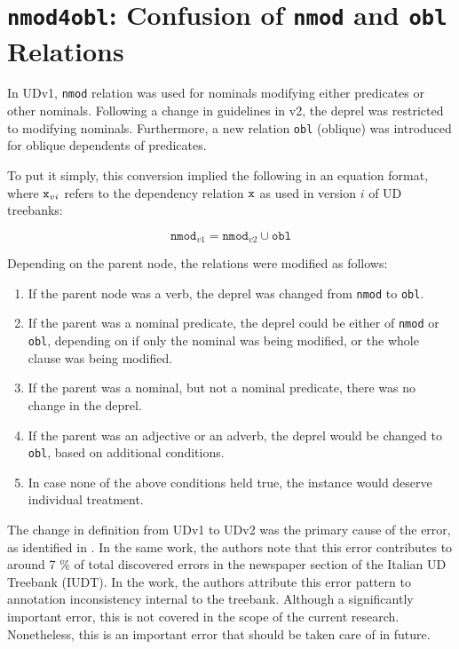 \section{\texttt{nmod4obl}: Confusion of \texttt{nmod} and \texttt{obl} Relations}
\label{sec:probnmod4obl}

In UDv1, \verb|nmod| relation was used for nominals modifying either predicates or other nominals. Following a change in guidelines in v2, the deprel was restricted to modifying nominals. Furthermore, a new relation \verb|obl| (oblique) was introduced for oblique dependents of predicates.

To put it simply, this conversion implied the following in an equation format, where \(\verb|x|_{vi}\) refers to the dependency relation \(\verb|x|\) as used in version \(i\) of UD treebanks:

\begin{equation*}
    \boxed{\texttt{nmod}_{v1} = \texttt{nmod}_{v2} \cup \texttt{obl}}
\end{equation*}

Depending on the parent node, the relations were modified as follows:

\begin{enumerate}
    \item If the parent node was a verb, the deprel was changed from \texttt{nmod} to \texttt{obl}.
    \item If the parent was a nominal predicate, the deprel could be either of \texttt{nmod} or \texttt{obl}, depending on if only the nominal was being modified, or the whole clause was being modified.
    \item If the parent was a nominal, but not a nominal predicate, there was no change in the deprel.
    \item If the parent was an adjective or an adverb, the deprel would be changed to \texttt{obl}, based on additional conditions.
    \item In case none of the above conditions held true, the instance would deserve individual treatment.
\end{enumerate}

The change in definition from UDv1 to UDv2 was the primary cause of the error, as identified in \cite{alzetta2017dangerous}. In the same work, the authors note that this error contributes to around 7 \% of total discovered errors in the newspaper section of the Italian UD Treebank (IUDT). In the work, the authors attribute this error pattern to annotation inconsistency internal to the treebank. Although a significantly important error, this is not covered in the scope of the current research. Nonetheless, this is an important error that should be taken care of in future.

